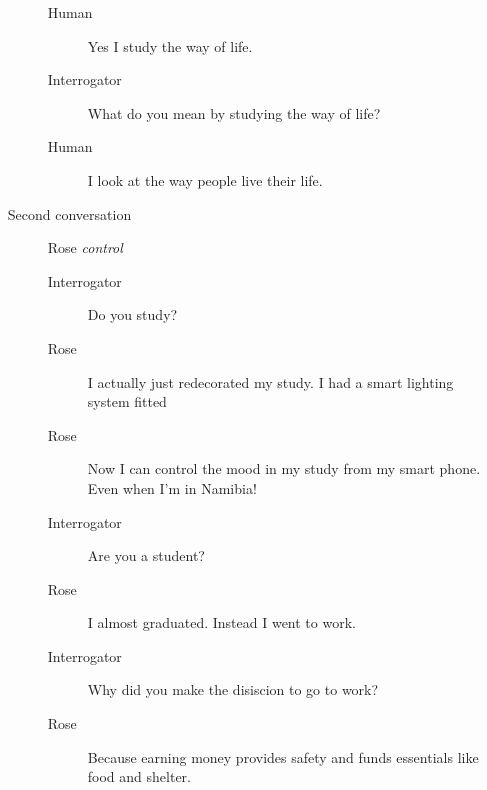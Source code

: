 \begin{itemize}
\begin{description}
\begin{description}
               \item [Human] Yes I study the way of life.
               \item [Interrogator] What do you mean by studying the way of life?
               \item [Human] I look at the way people live their life.
            \end{description}
         \item [Second conversation] Rose \textit{control}
            \begin{description}
               \item [Interrogator] Do you study?
               \item [Rose] I actually just redecorated my study. I had a smart lighting system fitted
               \item [Rose] Now I can control the mood in my study from my smart phone. Even when I'm in Namibia!
               \item [Interrogator] Are you a student?
               \item [Rose] I almost graduated. Instead I went to work.
               \item [Interrogator] Why did you make the disiscion to go to work?
               \item [Rose] Because earning money provides safety and funds essentials like food and shelter.
            \end{description}
      \end{description}


\end{itemize}
